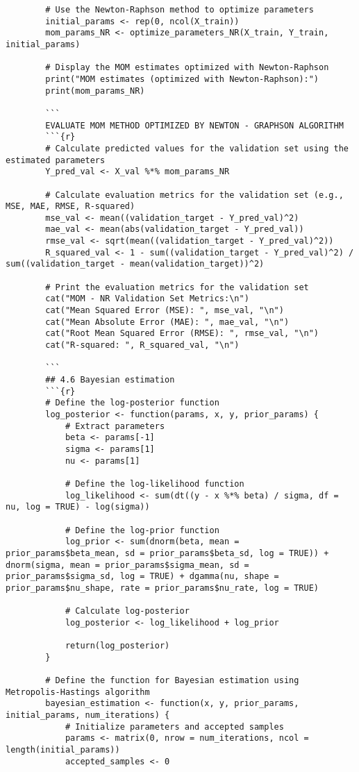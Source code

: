 \documentclass[12pt]{article}
\begin{document}
\begin{lstlisting}
		# Use the Newton-Raphson method to optimize parameters
		initial_params <- rep(0, ncol(X_train))
		mom_params_NR <- optimize_parameters_NR(X_train, Y_train, initial_params)
		
		# Display the MOM estimates optimized with Newton-Raphson
		print("MOM estimates (optimized with Newton-Raphson):")
		print(mom_params_NR)
		
		```
		EVALUATE MOM METHOD OPTIMIZED BY NEWTON - GRAPHSON ALGORITHM
		```{r}
		# Calculate predicted values for the validation set using the estimated parameters
		Y_pred_val <- X_val %*% mom_params_NR
		
		# Calculate evaluation metrics for the validation set (e.g., MSE, MAE, RMSE, R-squared)
		mse_val <- mean((validation_target - Y_pred_val)^2)
		mae_val <- mean(abs(validation_target - Y_pred_val))
		rmse_val <- sqrt(mean((validation_target - Y_pred_val)^2))
		R_squared_val <- 1 - sum((validation_target - Y_pred_val)^2) / sum((validation_target - mean(validation_target))^2)
		
		# Print the evaluation metrics for the validation set
		cat("MOM - NR Validation Set Metrics:\n")
		cat("Mean Squared Error (MSE): ", mse_val, "\n")
		cat("Mean Absolute Error (MAE): ", mae_val, "\n")
		cat("Root Mean Squared Error (RMSE): ", rmse_val, "\n")
		cat("R-squared: ", R_squared_val, "\n")
		
		```
		## 4.6 Bayesian estimation
		```{r}
		# Define the log-posterior function
		log_posterior <- function(params, x, y, prior_params) {
			# Extract parameters
			beta <- params[-1]
			sigma <- params[1]
			nu <- params[1]
			
			# Define the log-likelihood function
			log_likelihood <- sum(dt((y - x %*% beta) / sigma, df = nu, log = TRUE) - log(sigma))
			
			# Define the log-prior function
			log_prior <- sum(dnorm(beta, mean = prior_params$beta_mean, sd = prior_params$beta_sd, log = TRUE)) + dnorm(sigma, mean = prior_params$sigma_mean, sd = prior_params$sigma_sd, log = TRUE) + dgamma(nu, shape = prior_params$nu_shape, rate = prior_params$nu_rate, log = TRUE)
			
			# Calculate log-posterior
			log_posterior <- log_likelihood + log_prior
			
			return(log_posterior)
		}
		
		# Define the function for Bayesian estimation using Metropolis-Hastings algorithm
		bayesian_estimation <- function(x, y, prior_params, initial_params, num_iterations) {
			# Initialize parameters and accepted samples
			params <- matrix(0, nrow = num_iterations, ncol = length(initial_params))
			accepted_samples <- 0
			

\end{lstlisting}
\end{document}
